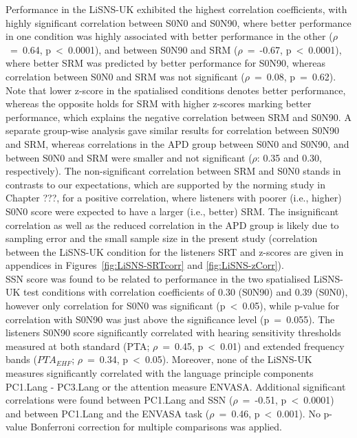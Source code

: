 \documentclass[a4paper, twoside]{templates/ociamthesis}
\begin{document}
Performance in the LiSNS-UK exhibited the highest correlation coefficients, with highly significant correlation between S0N0 and S0N90, where better performance in one condition was highly associated with better performance in the other (\(\rho\)~=~0.64, p~\textless~0.0001), and between S0N90 and SRM (\(\rho\)~=~-0.67, p~\textless~0.0001), where better SRM was predicted by better performance for S0N90, whereas correlation between S0N0 and SRM was not significant (\(\rho\)~=~0.08, p~=~0.62). Note that lower z-score in the spatialised conditions denotes better performance, whereas the opposite holds for SRM with higher z-scores marking better performance, which explains the negative correlation between SRM and S0N90. A separate group-wise analysis gave similar results for correlation between S0N90 and SRM, whereas correlations in the APD group between S0N0 and S0N90, and between S0N0 and SRM were smaller and not significant (\(\rho\): 0.35 and 0.30, respectively). The non-significant correlation between SRM and S0N0 stands in contrasts to our expectations, which are supported by the norming study in Chapter ???, for a positive correlation, where listeners with poorer (i.e., higher) S0N0 score were expected to have a larger (i.e., better) SRM. The insignificant correlation as well as the reduced correlation in the APD group is likely due to sampling error and the small sample size in the present study (correlation between the LiSNS-UK condition for the listeners SRT and z-scores are given in appendices in Figures~\ref{fig:LiSNS-SRTcorr} and \ref{fig:LiSNS-zCorr}).\\

SSN score was found to be related to performance in the two spatialised LiSNS-UK test conditions with correlation coefficients of 0.30 (S0N90) and 0.39 (S0N0), however only correlation for S0N0 was significant (p~\textless~0.05), while p-value for correlation with S0N90 was just above the significance level (p~=~0.055). The listeners S0N90 score significantly correlated with hearing sensitivity thresholds measured at both standard (PTA; \(\rho\)~=~0.45, p~\textless~0.01) and extended frequency bands (\(PTA_{EHF}\); \(\rho\)~=~0.34, p~\textless~0.05). Moreover, none of the LiSNS-UK measures significantly correlated with the language principle components PC1.Lang - PC3.Lang or the attention measure ENVASA. Additional significant correlations were found between PC1.Lang and SSN (\(\rho\)~=~-0.51, p~\textless~0.0001) and between PC1.Lang and the ENVASA task (\(\rho\)~=~0.46, p~\textless~0.001). No p-value Bonferroni correction for multiple comparisons was applied.
\end{document}
